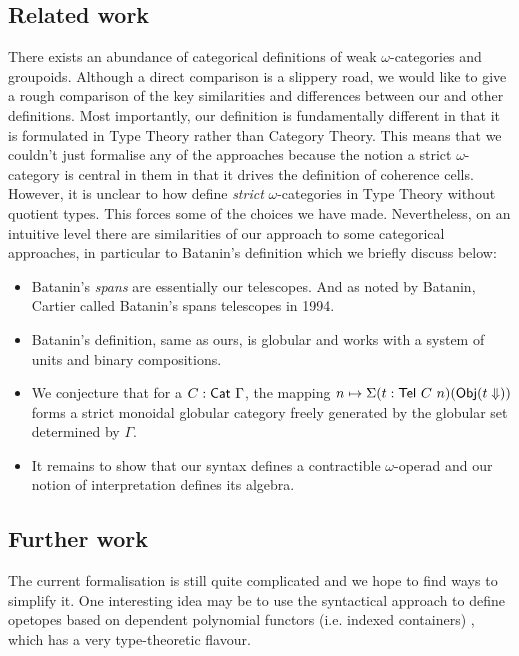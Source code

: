 \subsection{Related work}
There exists an abundance of categorical definitions of weak
$\omega$-categories and groupoids.  Although a direct comparison is a
slippery road, we would like to give a rough comparison of the key
similarities and differences between our and other definitions. Most
importantly, our definition is fundamentally different in that it is
formulated in Type Theory rather than Category Theory. This means that
we couldn't just formalise any of the approaches
\cite{penon:1999,batanin98:monoidal-globular,leinster:2000} because
the notion a strict $\omega$-category is central in them in that it
drives the definition of coherence cells. However, it is unclear to how define
\emph{strict} $\omega$-categories in Type Theory
without quotient types. This forces some of the choices we have
made. Nevertheless, on an intuitive level there are similarities of
our approach to some 
categorical approaches, in particular to Batanin's definition
\cite{batanin98:monoidal-globular} which we briefly discuss below:  
\begin{itemize}
\item Batanin's \emph{spans} are essentially our telescopes. And as
  noted by Batanin, Cartier called Batanin's spans telescopes in
  1994. 
\item Batanin's definition, same as ours, is globular and works with a system of
  units and binary compositions. 
\item We conjecture that for a $C : \mathsf{Cat}~\Gamma$, the mapping 
  $n \mapsto \Sigma(t : \mathsf{Tel}~C~n) (\mathsf{Obj} (t \Downarrow))$
  forms a strict monoidal globular category freely generated by the
  globular set determined by $\Gamma$. 
\item It remains to show that our syntax defines a contractible
  $\omega$-operad and our notion of interpretation defines its
  algebra.
\end{itemize}
%



\subsection{Further work}
The current formalisation is still quite complicated and we hope to
find ways to simplify it. One interesting idea may be to use the
syntactical approach to define opetopes based on dependent polynomial
functors (i.e. indexed containers) \cite{opetopes}, which has a very
type-theoretic flavour.


